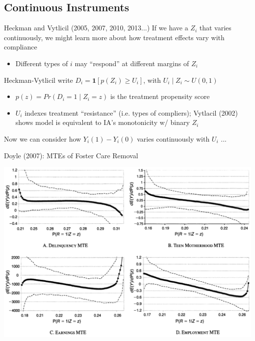 \documentclass{beamer}
\begin{document}
\subsection{Continuous Instruments}
\begin{frame}{Heckman and Vytlicil (2005, 2007, 2010, 2013...)}
If we have a $Z_i$ that varies continuously, we might learn more about how treatment effects vary with compliance \smallskip
\begin{itemize}
\item Different types of $i$ may ``respond'' at different margins of $Z_i$
\end{itemize}\medskip\pause{}
Heckman-Vytlicil write $D_i=\mathbf{1}[p(Z_i)\ge U_i]$, with $U_i\mid Z_i\sim U(0,1)$\smallskip
\begin{itemize}
\item $p(z)=Pr(D_i=1\mid Z_i=z)$ is the treatment propensity score\smallskip
\item $U_i$ indexes treatment ``resistance'' (i.e. types of compliers); Vytlacil (2002) shows model is equivalent to IA's monotonicity w/ binary $Z_i$
\end{itemize}\medskip\pause{}
Now we can consider how $Y_i(1)-Y_i(0)$ varies continuously with $U_i$ ...
\end{frame}

\begin{frame}{Doyle (2007): MTEs of Foster Care Removal}
\vspace{-0.8cm}
\begin{center}
\includegraphics[scale=0.3]{./lecture_includes/doyle_mtes.png}
\end{center}
\end{frame}
\end{document}
